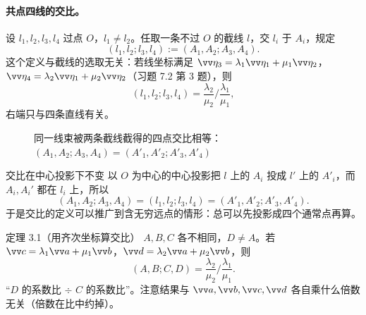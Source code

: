 \paragraph{共点四线的交比。}设 $l_1,l_2,l_3,l_4$ 过点 $O$，$l_1\neq l_2$。任取一条不过 $O$ 的截线 $l$，交 $l_i$ 于 $A_i$，规定
\begin{equation}
(l_1,l_2;l_3,l_4):=(A_1,A_2;A_3,A_4).
\end{equation}
这个定义与截线的选取无关：若线坐标满足 $\vv\eta_3=\lambda_1\vv\eta_1+\mu_1\vv\eta_2$，$\vv\eta_4=\lambda_2\vv\eta_1+\mu_2\vv\eta_2$（习题 7.2 第 3 题），则
\begin{equation}
(l_1,l_2;l_3,l_4)=\frac{\lambda_2}{\mu_2}\Big/\frac{\lambda_1}{\mu_1},
\end{equation}
右端只与四条直线有关。

\begin{figure}[htbp]
\centering
{}
\caption{同一线束被两条截线截得的四点交比相等：$(A_1,A_2;A_3,A_4)=(A'_1,A'_2;A'_3,A'_4)$}
\end{figure}

\begin{thmbox}{交比在中心投影下不变}
以 $O$ 为中心的中心投影把 $l$ 上的 $A_i$ 投成 $l'$ 上的 $A'_i$，而 $A_i,A_i'$ 都在 $l_i$ 上，所以
\[
(A_1,A_2;A_3,A_4)=(l_1,l_2;l_3,l_4)=(A'_1,A'_2;A'_3,A'_4).
\]
于是交比的定义可以推广到含无穷远点的情形：总可以先投影成四个通常点再算。
\end{thmbox}

\begin{thmbox}{定理 3.1（用齐次坐标算交比）}
$A,B,C$ 各不相同，$D\neq A$。若 $\vv c=\lambda_1\vv a+\mu_1\vv b$，$\vv d=\lambda_2\vv a+\mu_2\vv b$，则
\begin{equation}
(A,B;C,D)=\frac{\lambda_2}{\mu_2}\Big/\frac{\lambda_1}{\mu_1}.
\end{equation}
\ji “$D$ 的系数比 $\div$ $C$ 的系数比”。注意结果与 $\vv a,\vv b,\vv c,\vv d$ 各自乘什么倍数无关（倍数在比中约掉）。
\end{thmbox}


